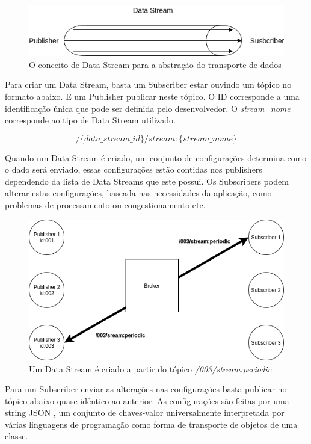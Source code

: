 \begin{figure}[h!]
\centering
\includegraphics[width=13cm]{./02_Capitulos/02_Cap3/figures/data_stream}
\caption{O conceito de Data Stream para a abstração do transporte de dados}
\label{fig:3.1.0/data_stream}
\end{figure}

Para criar um Data Stream, basta um Subscriber estar ouvindo um tópico no formato abaixo. E um Publisher publicar neste tópico. O ID corresponde a uma identificação única que pode ser definida pelo desenvolvedor. O \textit{stream\_nome} corresponde ao tipo de Data Stream utilizado.

$$ /\{data\_stream\_id\}/stream:\{stream\_nome\} $$

Quando um Data Stream é criado, um conjunto de configurações determina como o dado será enviado, essas configurações estão contidas nos publishers dependendo da lista de Data Streams que este possui. Os Subscribers podem alterar estas configurações, baseada nas necessidades da aplicação, como problemas de processamento ou congestionamento etc.

\begin{figure}[h!]
\centering
\includegraphics[width=13cm]{./02_Capitulos/02_Cap3/figures/data_stream_creation}
\caption{Um Data Stream é criado a partir do tópico \textit{/003/stream:periodic}}
\label{fig:3.1.0/data_stream_creation}
\end{figure}


Para um Subscriber enviar as alterações nas configurações basta publicar no tópico abaixo quase idêntico ao anterior. As configurações são feitas por uma string JSON \cite{json}, um conjunto de chaves-valor universalmente interpretada por várias linguagens de programação como forma de transporte de objetos de uma classe.


